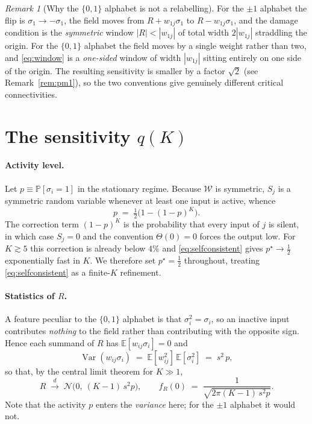 \documentclass[11pt]{article}
\theoremstyle{remark}
\newtheorem{remark}{Remark}
\newcommand{\E}{\mathbb{E}}
\newcommand{\Prob}{\mathbb{P}}
\begin{document}
\begin{remark}[Why the $\{0,1\}$ alphabet is not a relabelling]
\label{rem:alphabet}
For the $\pm1$ alphabet the flip is $\sigma_1\to-\sigma_1$, the field moves from
$R+w_{1j}\sigma_1$ to $R-w_{1j}\sigma_1$, and the damage condition is the
\emph{symmetric} window $|R|<|w_{1j}|$ of total width $2|w_{1j}|$ straddling the
origin. For the $\{0,1\}$ alphabet the field moves by a single weight rather than
two, and \eqref{eq:window} is a \emph{one-sided} window of width $|w_{1j}|$
sitting entirely on one side of the origin. The resulting sensitivity is smaller
by a factor $\sqrt2$ (see Remark~\ref{rem:pm1}), so the two conventions give
genuinely different critical connectivities.
\end{remark}

\section{The sensitivity $q(K)$}

\paragraph{Activity level.} Let $p\equiv\Prob[\sigma_i=1]$ in the stationary
regime. Because $\mathcal{W}$ is symmetric, $S_j$ is a symmetric random variable
whenever at least one input is active, whence
\begin{equation}
  p \;=\; \tfrac12\Big(1-(1-p)^{K}\Big).
  \label{eq:selfconsistent}
\end{equation}
The correction term $(1-p)^K$ is the probability that every input of $j$ is
silent, in which case $S_j=0$ and the convention $\Theta(0)=0$ forces the output
low. For $K\gtrsim 5$ this correction is already below $4\%$ and
\eqref{eq:selfconsistent} gives $p^\star\to\tfrac12$ exponentially fast in $K$.
We therefore set $p^\star=\tfrac12$ throughout, treating \eqref{eq:selfconsistent}
as a finite-$K$ refinement.

\paragraph{Statistics of $R$.} A feature peculiar to the $\{0,1\}$ alphabet is
that $\sigma_i^2=\sigma_i$, so an inactive input contributes \emph{nothing} to
the field rather than contributing with the opposite sign. Hence each summand of
$R$ has $\E[w_{ij}\sigma_i]=0$ and
\begin{equation}
  \operatorname{Var}(w_{ij}\sigma_i)
  \;=\; \E[w_{ij}^2]\,\E[\sigma_i^2]
  \;=\; s^2\,p ,
\end{equation}
so that, by the central limit theorem for $K\gg1$,
\begin{equation}
  R \;\xrightarrow{\ d\ }\; \mathcal{N}\big(0,\ (K-1)\,s^2 p\big),
  \qquad
  f_R(0)\;=\;\frac{1}{\sqrt{2\pi (K-1)\,s^2 p}} .
  \label{eq:Rdist}
\end{equation}
Note that the activity $p$ enters the \emph{variance} here; for the $\pm1$
alphabet it would not.
\end{document}
